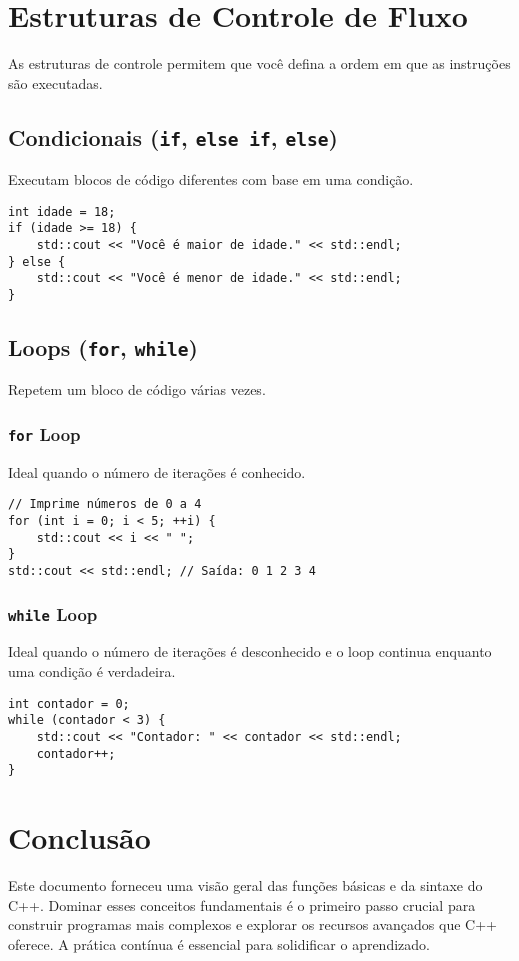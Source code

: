 \documentclass{article}
\begin{document}
\section{Estruturas de Controle de Fluxo}
As estruturas de controle permitem que você defina a ordem em que as instruções são executadas.

\subsection{Condicionais (\texttt{if}, \texttt{else if}, \texttt{else})}
Executam blocos de código diferentes com base em uma condição.

\begin{lstlisting}[caption={Exemplo de Condicional}]
int idade = 18;
if (idade >= 18) {
    std::cout << "Você é maior de idade." << std::endl;
} else {
    std::cout << "Você é menor de idade." << std::endl;
}
\end{lstlisting}

\subsection{Loops (\texttt{for}, \texttt{while})}
Repetem um bloco de código várias vezes.

\subsubsection{\texttt{for} Loop}
Ideal quando o número de iterações é conhecido.

\begin{lstlisting}[caption={\texttt{for} Loop}]
// Imprime números de 0 a 4
for (int i = 0; i < 5; ++i) {
    std::cout << i << " ";
}
std::cout << std::endl; // Saída: 0 1 2 3 4
\end{lstlisting}

\subsubsection{\texttt{while} Loop}
Ideal quando o número de iterações é desconhecido e o loop continua enquanto uma condição é verdadeira.

\begin{lstlisting}[caption={\texttt{while} Loop}]
int contador = 0;
while (contador < 3) {
    std::cout << "Contador: " << contador << std::endl;
    contador++;
}
\end{lstlisting}

\section{Conclusão}
Este documento forneceu uma visão geral das funções básicas e da sintaxe do C++. Dominar esses conceitos fundamentais é o primeiro passo crucial para construir programas mais complexos e explorar os recursos avançados que C++ oferece. A prática contínua é essencial para solidificar o aprendizado.
\end{document}
